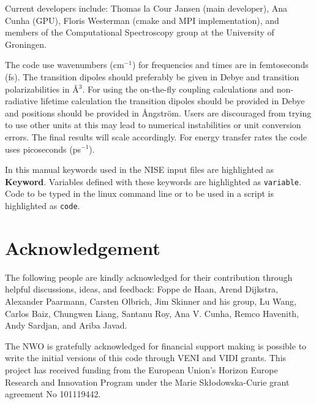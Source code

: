 \documentclass[12pt]{book}
\newcommand{\ilc}[1]{\colorbox{yellow!20}{\texttt{#1}}}
\newcommand{\ilk}[1]{{\textbf{\textbf{#1}}}}
\newcommand{\ilo}[1]{{\color{blue}\texttt{#1}\color{black}}}
\begin{document}
Current developers include: Thomas la Cour Jansen (main developer), Ana Cunha (GPU),
Floris Westerman (cmake and MPI implementation), and members of the Computational
Spectroscopy group at the University of Groningen.


The code use wavenumbers (cm$^{-1}$) for frequencies and times are in femtoseconds (fs).
The transition dipoles should preferably be given in Debye and transition
polarizabilities in \AA$^{3}$. For using the on-the-fly coupling calculations and
non-radiative lifetime calculation the transition dipoles should be provided in Debye
and positions should be provided in \AA ngstr\"{o}m. Users are discouraged from trying
to use other units at this may lead to numerical instabilities or unit conversion
errors. The final results will scale accordingly. For energy transfer rates the code
uses picoseconds (ps$^{-1}$).

In this manual keywords used in the NISE input files are highlighted as \ilk{Keyword}.
Variables defined with these keywords are highlighted as \ilo{variable}. Code to be
typed in the linux command line or to be used in a script is highlighted as \ilc{code}.











\chapter{Acknowledgement}
The following people are kindly acknowledged for their contribution through helpful
discussions, ideas, and feedback: Foppe de Haan, Arend Dijkstra, Alexander Paarmann,
Carsten Olbrich, Jim Skinner and his group, Lu Wang, Carlos Baiz, Chungwen Liang,
Santanu Roy, Ana V. Cunha, Remco Havenith, Andy Sardjan, and Ariba Javad. 

The NWO is gratefully acknowledged for financial support making is possible to write
the initial versions of this code through VENI and VIDI grants. This project has
received funding from the European Union’s Horizon Europe Research and Innovation
Program under the Marie Skłodowska-Curie grant agreement No 101119442.
 

\end{document}
